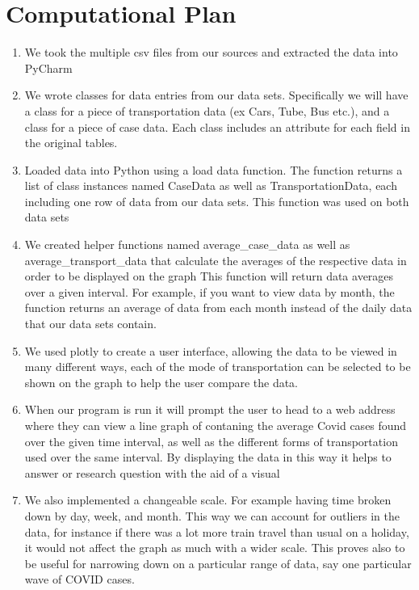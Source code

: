 \documentclass[fontsize=11pt]{article}
\begin{document}
  
\section*{Computational Plan}  
  
\begin{enumerate}  
    \item We took the multiple csv files from our sources and extracted the data into PyCharm   
    \item We wrote classes for data entries from our data sets. Specifically we will have a class for a piece of transportation data (ex Cars, Tube, Bus etc.), and a class for a piece of case data. Each class includes an attribute for each field in the original tables.   
    \item Loaded data into Python using a load data function. The function returns a list of class instances named CaseData as well as TransportationData, each including one row of data from our data sets. This function was used on both data sets
    \item We created helper functions named average\_case\_data as well as average\_transport\_data that calculate the averages of the respective data in order to be displayed on the graph This function will return data averages over a given interval. For example, if you want to view data by month, the function returns an average of data from each month instead of the daily data that our data sets contain.  
    \item We used plotly to create a user interface, allowing the data to be viewed in many different ways, each of the mode of transportation can be selected to be shown on the graph to help the user compare the data.
    \item When our program is run it will prompt the user to head to a web address where they can view a line graph of contaning the average Covid cases found over the given time interval, as well as the different forms of transportation used over the same interval. By displaying the data in this way it helps to answer or research question with the aid of a visual
    \item We also implemented a changeable scale. For example having time broken down by day, week, and month. This way we can account for outliers in the data, for instance if there was a lot more train travel than usual on a holiday, it would not affect the graph as much with a wider scale. This proves also to be useful for narrowing down on a particular range of data, say one particular wave of COVID cases.  
\end{enumerate}  
\end{document}
